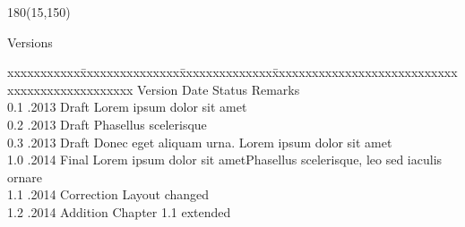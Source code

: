 \newpage
\begin{textblock}{180}(15,150)
\color{black}
\begin{huge}
Versions
\end{huge}
\vspace{10mm}

\fontsize{10pt}{18pt}\selectfont
\begin{tabbing}
xxxxxxxxxxx\=xxxxxxxxxxxxxxx\=xxxxxxxxxxxxxx\=xxxxxxxxxxxxxxxxxxxxxxxxxxxxxxxxxxxxxxxxxxxxxxx \kill
Version	\> Date	\> Status			\> Remarks		\\
0.1	.2013	\> Draft		\> Lorem ipsum dolor sit amet	\\	
0.2	.2013	\> Draft		\> Phasellus scelerisque	\\ 
0.3	.2013	\> Draft		\> Donec eget aliquam urna. Lorem ipsum dolor sit amet	\\ 
1.0	.2014	\> Final		\> Lorem ipsum dolor sit ametPhasellus scelerisque, leo sed iaculis ornare 	\\ 
1.1	.2014	\> Correction	\> Layout changed	\\
1.2	.2014	\> Addition		\> Chapter 1.1 extended	\\
\end{tabbing}

\end{textblock}
